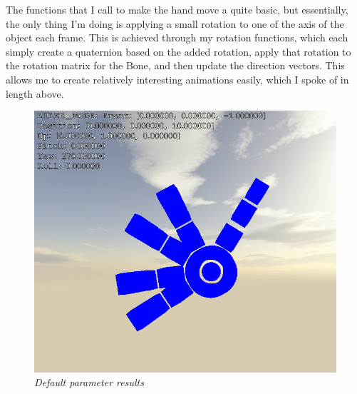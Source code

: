 \documentclass{article}
\begin{document}
The functions that I call to make the hand move a quite basic, but essentially, the only thing I'm doing is applying a small rotation to one of the axis of the object each frame. This is achieved through my rotation functions, which each simply create a quaternion based on the added rotation, apply that rotation to the rotation matrix for the Bone, and then update the direction vectors. This allows me to create relatively interesting animations easily, which I spoke of in length above.

\begin{figure}[H]
\centering\includegraphics[scale=0.5]{scene.png}
\caption{\textit{Default parameter results}}
\end{figure}
\end{document}
